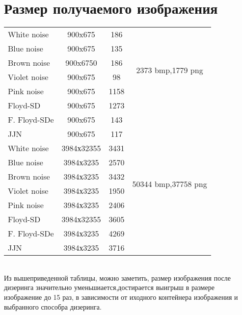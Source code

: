 \section{Размер получаемого изображения}
\begin{tabular}{|@{\hspace*{2mm}}l||*{3}{c|}}\hline
	
	&\makebox[8em]{Разрешение, пикс}&\makebox[5em]{Размер, кб} &\makebox[7em]{Исх. раз., кб}
	\\\hline\hline
	White noise&900x675&186&\multirow{6}{*}{2373 bmp,1779 png} \\\cline{1-3}
	Blue noise& 900x675&135& \\\cline{1-3}
	Brown noise&900x6750&186&\\\cline{1-3}
	Violet noise &900x675&98&\\\cline{1-3}
	Pink noise &900x675&1158&\\\cline{1-3}
	Floyd-SD& 900x675&1273&\\\cline{1-3}
	F. Floyd-SDe&900x675&143&\\\cline{1-3}
	JJN &900x675&117&\\\hline
	White noise&3984х32355&3431&\multirow{6}{*}{50344 bmp,37758 png} \\\cline{1-3}
	Blue noise& 3984х3235&2570& \\\cline{1-3}
	Brown noise&3984х3235&3432&\\\cline{1-3}
	Violet noise &3984х3235&1950&\\\cline{1-3}
	Pink noise &3984х3235&2406&\\\cline{1-3}
	Floyd-SD& 3984х32355&3605&\\\cline{1-3}
	F. Floyd-SDe&3984х3235&4269&\\\cline{1-3}
	JJN &3984х3235&3716&\\\hline
\end{tabular}
\bigskip
\\

Из вышеприведенной таблицы, можно заметить, размер изображения после дизеринга значительно уменьшиается,достирается выигрыш в размере изображение до 15 раз, в зависимости от иходного контейнера изображения и выбранного способра дизеринга.
